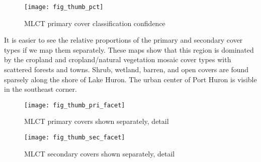 \begin{figure} 
\begin{center}
  
\begin{Schunk}
\end{Schunk}

\texttt{[image: fig\_thumb\_pct]}
\end{center} 
\caption{MLCT primary cover classification confidence} 
\label{fig:thumb_pct} 
\end{figure} 

It is easier to see the relative proportions of the primary and
secondary cover types if we map them separately.  These maps show that
this region is dominated by the cropland and cropland/natural
vegetation mosaic cover types with scattered forests and towns.
Shrub, wetland, barren, and open covers are found sparsely along the
shore of Lake Huron.  The urban center of Port Huron is visible in the
southeast corner.

\begin{figure} 
\begin{center}
  
\begin{Schunk}
\end{Schunk}

\texttt{[image: fig\_thumb\_pri\_facet]}
\end{center} 
\caption{MLCT primary covers shown separately, detail} 
\label{fig:thumb_pri_reclass} 
\end{figure} 


\begin{figure} 
\begin{center}
  
\begin{Schunk}
\end{Schunk}

\texttt{[image: fig\_thumb\_sec\_facet]}
\end{center} 
\caption{MLCT secondary covers shown separately, detail} 
\label{fig:thumb_pri_reclass} 
\end{figure} 

